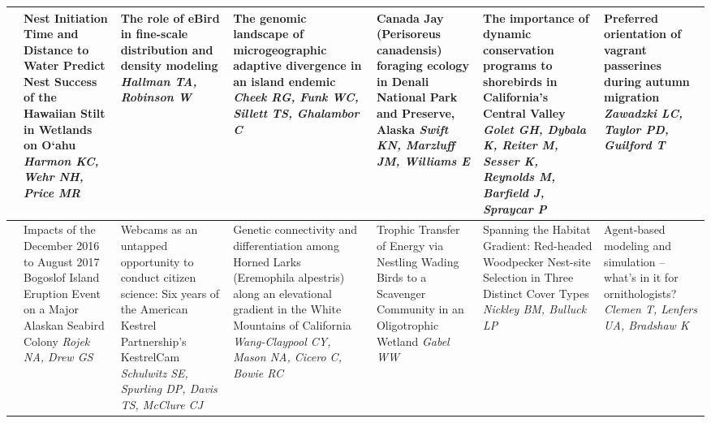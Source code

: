 \begin{tabular}{|x{0.75cm}|x{2.25cm}|x{2.25cm}|x{2.25cm}|x{2.25cm}|x{2.25cm}|x{2.25cm}|}
&Nest Initiation Time and Distance to Water Predict Nest Success of the Hawaiian Stilt in Wetlands on O‘ahu \newline \newline \textit{Harmon KC, Wehr NH, Price MR} & The role of eBird in fine-scale distribution and density modeling \newline \newline \textit{Hallman TA, Robinson W} & The genomic landscape of microgeographic adaptive divergence in an island endemic \newline \newline \textit{Cheek RG, Funk WC, Sillett TS, Ghalambor C} & Canada Jay (Perisoreus canadensis) foraging ecology in Denali National Park and Preserve, Alaska \newline \newline \textit{Swift KN, Marzluff JM, Williams E} & The importance of dynamic conservation programs to shorebirds in California’s Central Valley \newline \newline \textit{Golet GH, Dybala K, Reiter M, Sesser K, Reynolds M, Barfield J, Spraycar P} & Preferred orientation of vagrant passerines during autumn migration \newline \newline \textit{Zawadzki LC, Taylor PD, Guilford T}\\
\hline
{}&Impacts of the December 2016 to August 2017 Bogoslof Island Eruption Event on a Major Alaskan Seabird Colony \newline \newline \textit{Rojek NA, Drew GS} & Webcams as an untapped opportunity to conduct citizen science: Six years of the American Kestrel Partnership's KestrelCam \newline \newline \textit{Schulwitz SE, Spurling DP, Davis TS, McClure CJ} & Genetic connectivity and differentiation among Horned Larks (Eremophila alpestris) along an elevational gradient in the White Mountains of California \newline \newline \textit{Wang-Claypool CY, Mason NA, Cicero C, Bowie RC} & Trophic Transfer of Energy via Nestling Wading Birds to a Scavenger Community in an Oligotrophic Wetland \newline \newline \textit{Gabel WW} & Spanning the Habitat Gradient: Red-headed Woodpecker Nest-site Selection in Three Distinct Cover Types \newline \newline \textit{Nickley BM, Bulluck LP} & Agent-based modeling and simulation – what’s in it for ornithologists? \newline \newline \textit{Clemen T, Lenfers UA, Bradshaw K}\\

\end{tabular}
